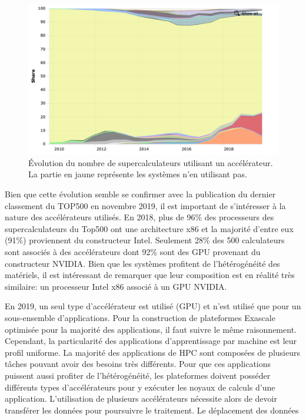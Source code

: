         \begin{figure}
            \center
            \includegraphics[width=12cm]{images/methodo_top500_accelerator.png}
            \caption{\label{pic:methodo_top500_accelerator} Évolution du nombre de supercalculateurs utilisant un accélérateur\protect\footnotemark. La partie en jaune représente les systèmes n'en utilisant pas.}
        \end{figure}
        
        
        Bien que cette évolution semble se confirmer avec la publication du dernier classement du TOP500 en novembre 2019, il est important de s'intéresser à la nature des accélérateurs utilisés.
        En 2018, plus de 96\% des processeurs des supercalculateurs du Top500 ont une architecture x86 et la majorité d'entre eux (91\%) proviennent du constructeur Intel. Seulement 28\% des 500 calculateurs sont associés à des accélérateurs dont 92\% sont des GPU provenant du constructeur NVIDIA. Bien que les systèmes profitent de l'hétérogénéité des matériels, il est intéressant de remarquer que leur composition est en réalité très similaire: un processeur Intel x86 associé à un GPU NVIDIA.
        
        En 2019, un seul type d'accélérateur est utilisé (GPU) et n'est utilisé que pour un sous-ensemble d'applications. Pour la construction de plateformes Exascale optimisée pour la majorité des applications, il faut suivre le même raisonnement. Cependant, la particularité des applications d'apprentissage par machine est leur profil uniforme. La majorité des applications de HPC sont composées de plusieurs tâches pouvant avoir des besoins très différents. Pour que ces applications puissent aussi profiter de l'hétérogénéité, les plateformes doivent posséder différents types d'accélérateurs pour y exécuter les noyaux de calculs d'une application. L'utilisation de plusieurs accélérateurs nécessite alors de devoir transférer les données pour poursuivre le traitement. Le déplacement des données
        
